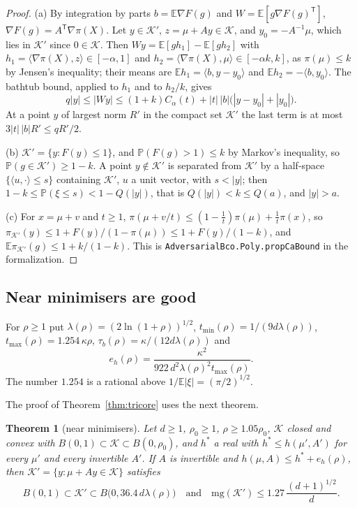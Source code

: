 \documentclass[11pt]{amsart}
\newtheorem{theorem}{Theorem}[section]
\theoremstyle{definition}
\numberwithin{equation}{section}
\newcommand{\E}{\mathbb{E}}
\newcommand{\Prob}{\mathbb{P}}
\newcommand{\cK}{\mathcal{K}}
\newcommand{\ip}[1]{\langle #1\rangle}
\begin{document}
\begin{proof}
(a) By integration by parts $b=\E\nabla F(g)$ and $W=\E[g\nabla F(g)^{\mathsf T}]$, $\nabla F(g)=A^{\mathsf T}\nabla\pi(X)$. Let $y\in\cK'$, $z=\mu+Ay\in\cK$, and $y_0=-A^{-1}\mu$, which lies in $\cK'$ since $0\in\cK$. Then $Wy=\E[gh_1]-\E[gh_2]$ with $h_1=\ip{\nabla\pi(X),z}\in[-\alpha,1]$ and $h_2=\ip{\nabla\pi(X),\mu}\in[-\alpha k,k]$, as $\pi(\mu)\le k$ by Jensen's inequality; their means are $\E h_1=\ip{b,y-y_0}$ and $\E h_2=-\ip{b,y_0}$. The bathtub bound, applied to $h_1$ and to $h_2/k$, gives
\[
q|y|\le|Wy|\le(1+k)C_\alpha(t)+|t|\,|b|\bigl(|y-y_0|+|y_0|\bigr).
\]
At a point $y$ of largest norm $R'$ in the compact set $\cK'$ the last term is at most $3|t|\,|b|R'\le qR'/2$.

(b) $\cK'=\{y:F(y)\le1\}$, and $\Prob(F(g)>1)\le k$ by Markov's inequality, so $\Prob(g\in\cK')\ge1-k$. A point $y\notin\cK'$ is separated from $\cK'$ by a half-space $\{\ip{u,\cdot}\le s\}$ containing $\cK'$, $u$ a unit vector, with $s<|y|$; then $1-k\le\Prob(\xi\le s)<1-Q(|y|)$, that is $Q(|y|)<k\le Q(a)$, and $|y|>a$.

(c) For $x=\mu+v$ and $t\ge1$, $\pi(\mu+v/t)\le(1-\frac1t)\pi(\mu)+\frac1t\pi(x)$, so $\pi_{\cK'}(y)\le1+F(y)/(1-\pi(\mu))\le1+F(y)/(1-k)$, and $\E\pi_{\cK'}(g)\le1+k/(1-k)$.
This is \texttt{AdversarialBco.Poly.propCaBound} in the formalization.
\end{proof}

\subsection{Near minimisers are good}\label{app:nearmin}

For $\rho\ge1$ put $\lambda(\rho)=(2\ln(1+\rho))^{1/2}$, $t_{\min}(\rho)=1/(9d\lambda(\rho))$, $t_{\max}(\rho)=1.254\,\kappa\rho$, $\tau_b(\rho)=\kappa/(12d\lambda(\rho))$ and
\[
e_h(\rho)=\frac{\kappa^2}{922\,d^2\lambda(\rho)^2t_{\max}(\rho)} .
\]
The number $1.254$ is a rational above $1/\E|\xi|=(\pi/2)^{1/2}$.

The proof of Theorem~\ref{thm:tricore} uses the next theorem.

\begin{theorem}[near minimisers]\label{thm:nmg}
Let $d\ge1$, $\rho_0\ge1$, $\rho\ge1.05\rho_0$, $\cK$ closed and convex with $B(0,1)\subset\cK\subset B(0,\rho_0)$, and $h^*$ a real with $h^*\le h(\mu',A')$ for every $\mu'$ and every invertible $A'$. If $A$ is invertible and $h(\mu,A)\le h^*+e_h(\rho)$, then $\cK'=\{y:\mu+Ay\in\cK\}$ satisfies
\[
B(0,1)\subset\cK'\subset B\bigl(0,36.4\,d\lambda(\rho)\bigr)\quad\text{and}\quad \mathrm{mg}(\cK')\le1.27\,\frac{(d+1)^{1/2}}d .
\]
\end{theorem}
\end{document}
